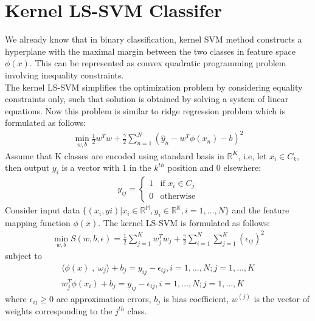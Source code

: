 \documentclass[conference]{IEEEtran}
\begin{document}
    \section{Kernel LS-SVM Classifer}\label{sec:kernel-ls-svm-classifer}
    We already know that in binary classification, kernel SVM method constructs a hyperplane with the maximal margin
    between the two classes in feature space $ \phi(x) $.
    This can be represented as convex quadratic programming problem
    involving inequality constraints. \\
    The kernel LS-SVM simplifies the optimization problem by
    considering equality constraints only, such that solution is obtained by solving a system of linear equations.
    Now this problem is similar to ridge regression problem which is formulated as follows:
    \begin{align}
        \min_{w,b} \frac{1}{2}w^{T}w + \frac{\gamma}{2}\sum_{n=1}^{N}(\hat{y}_{n} - w^{T}\phi(x_{n}) - b)^{2}
    \end{align}
    Assume that K classes are encoded using standard basis in $\mathbb{R}^{K}$, i.e, let $x_{i} \in C_{k}$, then output
    $ y_{i}$ is a vector with 1 in the $k^{th}$ position and 0 elsewhere:
    \begin{align}
        y_{ij} = \begin{cases}
                     1 & \text{if } x_{i} \in C_{j} \\
                     0 & \text{otherwise}
        \end{cases}
    \end{align}
    Consider input data $\{(x_{i},y{i}) | x_{i}\in\mathbb{R^{M}},y_{i}\in\mathbb{R^{K}}, i = 1,\ldots,N\}$ and the
    feature mapping function $\phi(x)$.
    The kernel LS-SVM is formulated as follows:
    \begin{align}
        \min_{w,b} S(w,b,\epsilon) = \frac{1}{2}\sum_{j=1}^{K}w_{j}^{T}w_{j} + \frac{\gamma}{2}\sum_{i=1}^{N}\sum_{j=1}^{K}(\epsilon_{ij})^{2}
    \end{align}
    subject to
    \begin{align}
        \langle \phi(x) \;,\; \omega_{j}  \rangle + b_{j} = y_{ij} - \epsilon_{ij}, i = 1,\ldots,N; j = 1,\ldots,K \\
        w_{j}^{T}\phi(x_{i}) + b_{j} = y_{ij} - \epsilon_{ij} , i = 1,\ldots,N; j = 1,\ldots,K
    \end{align}
    where $\epsilon_{ij} \geq 0$ are approximation errors, $b_{j}$ is bias coefficient, $w^{(j)}$ is the vector of
    weights corresponding to the $j^{th}$ class.
\end{document}
